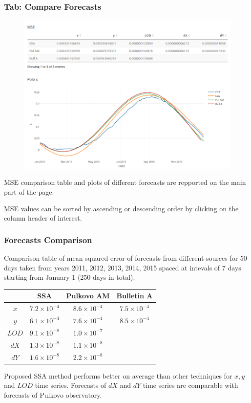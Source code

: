 \documentclass[pdf, unicode, notheorems, xcolor={table}]{beamer}
\begin{document}
\begin{frame}\frametitle{Tab: Compare Forecasts}
	\begin{figure}
		\includegraphics[width=0.7 \linewidth]{compare_result}
	\end{figure}
	MSE comparison table and plots of different forecasts are repported on the main part of the page.
	
	MSE values can be sorted by ascending or descending order by clicking on the column header of interest.
\end{frame}

\begin{frame}\frametitle{Forecasts Comparison}
	Comparison table of mean squared error of forecasts from different sources for 50 days taken from years 2011, 2012, 2013, 2014, 2015 spaced at intevals of 7 days starting from January 1 (250 days in total).
	\begin{table}[!hhh]
		\centering
		\small
		\begin{tabular}{|c|c|c|c|}
			\hline
			& SSA & Pulkovo AM & Bulletin A \\ 
			\hline
			$ x $   & \cellcolor{blue!25} $ 7.2 \times 10^{-4} $ & $ 8.6 \times 10^{-4} $ & $ 7.5 \times 10^{-4} $  \\ 
			\hline
			$ y $   & \cellcolor{blue!25} $ 6.1 \times 10^{-4} $ & $ 7.6 \times 10^{-4} $ & $ 8.5 \times 10^{-4} $ \\ 
			\hline
			$ LOD $ & \cellcolor{blue!25} $ 9.1 \times 10^{-8} $ & $ 1.0 \times 10^{-7} $ &  \\ 
			\hline
			$ dX $  & $ 1.3 \times 10^{-8} $ & \cellcolor{blue!25} $ 1.1 \times 10^{-8} $ &  \\ 
			\hline
			$ dY $  & \cellcolor{blue!25} $ 1.6 \times 10^{-8} $ & $ 2.2 \times 10^{-8} $ &  \\ 
			\hline
		\end{tabular} 
	\end{table}

	Proposed SSA method performs better on average than other techniques for $ x, y $ and $ LOD $ time series. Forecasts of $ dX $ and $ dY $ time series are comparable with forecasts of Pulkovo observatory.
\end{frame}
\end{document}
